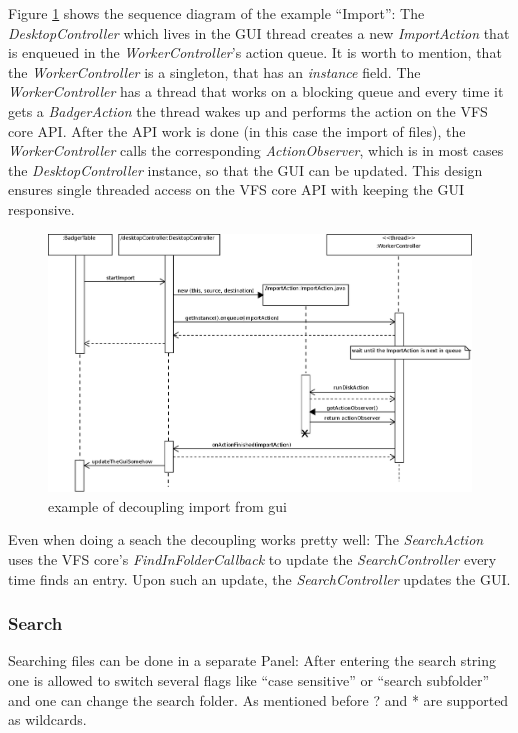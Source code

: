 Figure
\ref{fig:decouple_threads} shows the sequence diagram of the example ``Import'':
The \textit{DesktopController} which lives in the GUI thread creates a new
\textit{ImportAction} that is enqueued in the \textit{WorkerController}'s action queue. It is worth to mention, that the
\textit{WorkerController} is a singleton, that has an \textit{instance} field. The
\textit{WorkerController} has a thread that works on a blocking queue and every
time it gets a \textit{BadgerAction} the thread wakes up and performs the action
on the VFS core API. After the API work is done (in this case the import of
files), the \textit{WorkerController} calls the corresponding
\textit{ActionObserver}, which is in most cases the \textit{DesktopController}
instance, so that the GUI can be updated. This design ensures single threaded
access on the VFS core API with keeping the GUI responsive.

\begin{figure}[h!]
\centering
\includegraphics[width=1\textwidth]{figures/single_threaded_access.eps}
\caption{example of decoupling import from gui}
\label{fig:decouple_threads}
\end{figure}

Even when doing a seach the decoupling works pretty well: The
\textit{SearchAction} uses the VFS core's \textit{FindInFolderCallback} to
update the \textit{SearchController} every time finds an entry. Upon such an
update, the \textit{SearchController} updates the GUI.

\subsubsection{Search}
Searching files can be done in a separate Panel: After entering the search
string one is allowed to switch several flags like ``case sensitive'' or
``search subfolder'' and one can change the search folder. As mentioned before ? and * are supported as wildcards.

